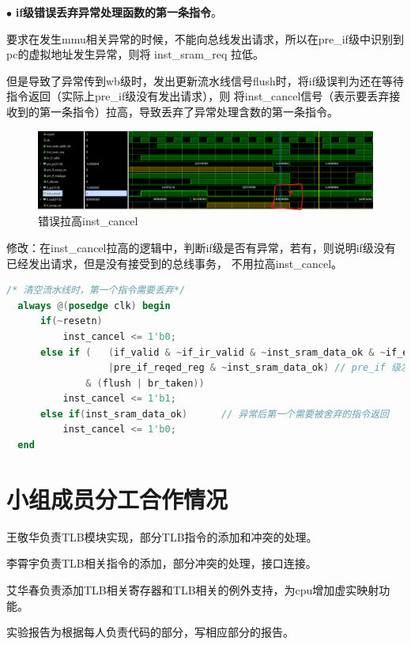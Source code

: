 \documentclass[11pt]{article}
\begin{document}
\noindent
$\bullet$
\textbf{if级错误丢弃异常处理函数的第一条指令}。

要求在发生mmu相关异常的时候，不能向总线发出请求，所以在pre\_if级中识别到pc的虚拟地址发生异常，则将 inst\_sram\_req
拉低。

但是导致了异常传到wb级时，发出更新流水线信号flush时，将if级误判为还在等待指令返回（实际上pre\_if级没有发出请求），则
将inst_cancel信号（表示要丢弃接收到的第一条指令）拉高，导致丢弃了异常处理含数的第一条指令。
\begin{figure}[H]
  \centering
  \includegraphics[width=15cm]{fig/fig1.png}
  \caption{错误拉高inst\_cancel}
\end{figure}
修改：在inst\_cancel拉高的逻辑中，判断if级是否有异常，若有，则说明if级没有已经发出请求，但是没有接受到的总线事务，
不用拉高inst\_cancel。
\begin{lstlisting}[language=verilog]
  /* 清空流水线时，第一个指令需要丢弃*/
  always @(posedge clk) begin
      if(~resetn)
          inst_cancel <= 1'b0;
      else if (   (if_valid & ~if_ir_valid & ~inst_sram_data_ok & ~if_excep_en  // if正在等待指令返回， 加入if级是否有异常的判断
                  |pre_if_reqed_reg & ~inst_sram_data_ok) // pre_if 级发出请求，但是数据没有返回，也还没有进入if级
              & (flush | br_taken))
          inst_cancel <= 1'b1;
      else if(inst_sram_data_ok)      // 异常后第一个需要被舍弃的指令返回
          inst_cancel <= 1'b0;
  end
\end{lstlisting}


      
\vspace{1ex}

\section{小组成员分工合作情况}
王敬华负责TLB模块实现，部分TLB指令的添加和冲突的处理。

李霄宇负责TLB相关指令的添加，部分冲突的处理，接口连接。

艾华春负责添加TLB相关寄存器和TLB相关的例外支持，为cpu增加虚实映射功能。

实验报告为根据每人负责代码的部分，写相应部分的报告。
\end{document}
